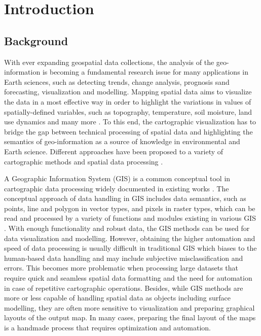 \documentclass[ijgi,article,submit,pdftex,moreauthors]{Definitions/mdpi}
\begin{document}
\section{Introduction}

\subsection{Background}
With ever expanding geospatial data collections, the analysis of the geo-information is becoming a fundamental research issue for many applications in Earth sciences, such as detecting trends, change analysis, prognosis sand forecasting, visualization and modelling. Mapping spatial data aims to visualize the data in a most effective way in order to highlight the variations in values of spatially-defined variables, such as topography, temperature, soil moisture, land use dynamics and many more \cite{Moreri,Mpofu,Lemenkova202203,Ramberg2006a}. To this end, the cartographic visualization has to bridge the gap between technical processing of spatial data and highlighting the semantics of geo-information as a source of knowledge in environmental and Earth science. Different approaches have been proposed to a variety of cartographic methods and spatial data processing \cite{ijgi11050313,Visvalingam,ijgi10110780,Lemenkova202105,ijgi11050297}.

A Geographic Information System (GIS) is a common conceptual tool in cartographic data processing widely documented in existing works \cite{Longley,Chrisman,VANKOVA2022708}. The conceptual approach of data handling in GIS includes data semantics, such as points, line and polygon in vector types, and pixels in raster types, which can be read and processed by a variety of functions and modules existing in various GIS \cite{ijgi11040257,Lemenkova202140,ijgi9110631}. With enough functionality and robust data, the GIS methods can be used for data visualization and modelling. However, obtaining the higher automation and speed of data processing is usually difficult in traditional GIS which biases to the human-based data handling and may include subjective misclassification and errors. This becomes more problematic when processing large datasets that require quick and seamless spatial data formatting and the need for automation in case of repetitive cartographic operations. Besides, while GIS methods are more or less capable of handling spatial data as objects including surface modelling, they are often more sensitive to visualization and preparing graphical layouts of the output map. In many cases, preparing the final layout of the maps is a handmade process that requires optimization and automation.
\end{document}
